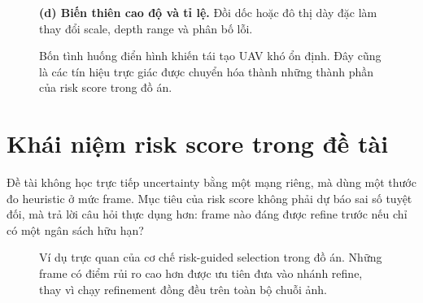 \documentclass[../DoAn.tex]{subfiles}
\begin{document}
\begin{figure}[H]
\begin{minipage}[t]{0.47\textwidth}
{\scriptsize \textbf{(d) Biến thiên cao độ và tỉ lệ.} Đồi dốc hoặc đô thị dày đặc làm thay đổi scale, depth range và phân bố lỗi.}
\end{minipage}
\caption{Bốn tình huống điển hình khiến tái tạo UAV khó ổn định. Đây cũng là các tín hiệu trực giác được chuyển hóa thành những thành phần của risk score trong đồ án.}
\label{fig:uav-difficulty-factors}
\end{figure}

\section{Khái niệm risk score trong đề tài}

Đề tài không học trực tiếp uncertainty bằng một mạng riêng, mà dùng một thước đo heuristic ở mức frame. Mục tiêu của risk score không phải dự báo sai số tuyệt đối, mà trả lời câu hỏi thực dụng hơn: frame nào đáng được refine trước nếu chỉ có một ngân sách hữu hạn?

\begin{figure}[H]
\centering
{}
\caption{Ví dụ trực quan của cơ chế risk-guided selection trong đồ án. Những frame có điểm rủi ro cao hơn được ưu tiên đưa vào nhánh refine, thay vì chạy refinement đồng đều trên toàn bộ chuỗi ảnh.}
\label{fig:risk-selection-theory}
\end{figure}
\end{document}
